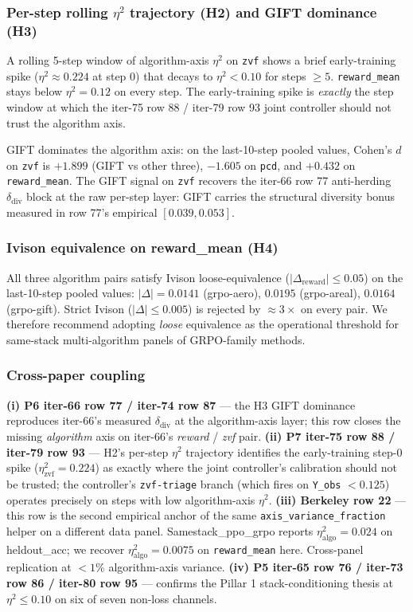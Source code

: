 \documentclass{article}  \usepackage[preprint,nonatbib]{neurips_2026} \usepackage[numbers]{natbib}
\begin{document}
\subsubsection{Per-step rolling $\eta^2$ trajectory (H2) and GIFT dominance (H3)}
\label{sec:p5-iter85-perstep}
A rolling 5-step window of algorithm-axis $\eta^2$ on \texttt{zvf}
shows a brief early-training spike ($\eta^2 \approx 0.224$ at step 0)
that decays to $\eta^2 < 0.10$ for steps $\ge 5$. \texttt{reward\_mean}
stays below $\eta^2 = 0.12$ on every step. The early-training spike is
\emph{exactly} the step window at which the iter-75 row 88 / iter-79
row 93 joint controller should not trust the algorithm axis.

GIFT dominates the algorithm axis: on the last-10-step pooled values,
Cohen's $d$ on \texttt{zvf} is $\mathbf{+1.899}$ (GIFT vs other three),
$\mathbf{-1.605}$ on \texttt{pcd}, and $\mathbf{+0.432}$ on
\texttt{reward\_mean}. The GIFT signal on \texttt{zvf} recovers the
iter-66 row 77 anti-herding $\delta_{\mathrm{div}}$ block at the raw
per-step layer: GIFT carries the structural diversity bonus measured in
row 77's empirical $[0.039, 0.053]$.

\subsubsection{Ivison equivalence on reward\_mean (H4)}
\label{sec:p5-iter85-h4}
All three algorithm pairs satisfy Ivison loose-equivalence
($|\Delta_{\mathrm{reward}}| \le 0.05$) on the last-10-step pooled
values: $|\Delta| = 0.0141$ (grpo-aero), $0.0195$ (grpo-areal),
$0.0164$ (grpo-gift). Strict Ivison ($|\Delta| \le 0.005$) is rejected
by $\approx 3\times$ on every pair. We therefore recommend adopting
\emph{loose} equivalence as the operational threshold for same-stack
multi-algorithm panels of GRPO-family methods.

\subsubsection{Cross-paper coupling}
\label{sec:p5-iter85-coupling}
\textbf{(i) P6 iter-66 row 77 / iter-74 row 87} --- the H3 GIFT
dominance reproduces iter-66's measured $\delta_{\mathrm{div}}$ at the
algorithm-axis layer; this row closes the missing \emph{algorithm}
axis on iter-66's \emph{reward} / \emph{zvf} pair.
\textbf{(ii) P7 iter-75 row 88 / iter-79 row 93} --- H2's per-step
$\eta^2$ trajectory identifies the early-training step-0 spike
($\eta^2_{\mathrm{zvf}} = 0.224$) as exactly where the joint
controller's calibration should not be trusted; the controller's
\texttt{zvf-triage} branch (which fires on \texttt{Y\_obs} $< 0.125$)
operates precisely on steps with low algorithm-axis $\eta^2$.
\textbf{(iii) Berkeley row 22} --- this row is the second empirical
anchor of the same \texttt{axis\_variance\_fraction} helper on a
different data panel. Samestack\_ppo\_grpo reports
$\eta^2_{\mathrm{algo}} = 0.024$ on heldout\_acc; we recover
$\eta^2_{\mathrm{algo}} = 0.0075$ on \texttt{reward\_mean} here.
Cross-panel replication at $<1\%$ algorithm-axis variance.
\textbf{(iv) P5 iter-65 row 76 / iter-73 row 86 / iter-80 row 95} ---
confirms the Pillar 1 stack-conditioning thesis at $\eta^2 \le 0.10$
on six of seven non-loss channels.
\end{document}
